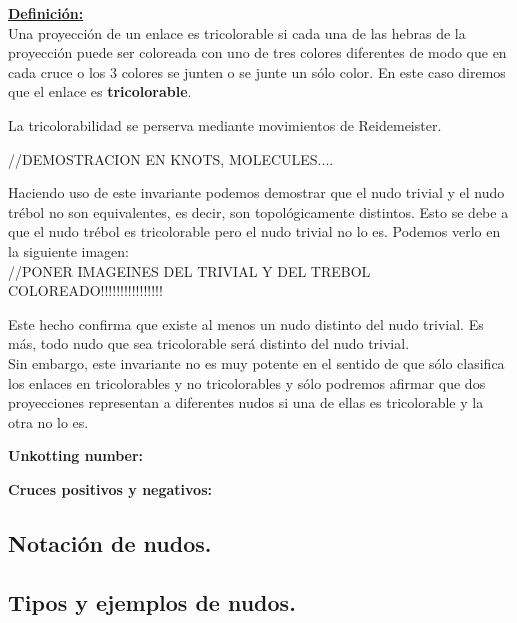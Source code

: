 \documentclass[14pt]{extarticle}
\begin{document}
\underline{\textbf{Definición:}}\\
Una proyección de un enlace es tricolorable si cada una de las hebras de la proyección puede ser coloreada con uno de tres colores diferentes de modo que en cada cruce o los 3 colores se junten o se junte un sólo color. En este caso diremos que el enlace es \textbf{tricolorable}. 

\begin{teo}
	La tricolorabilidad se perserva mediante movimientos de Reidemeister.
\end{teo}
//DEMOSTRACION EN KNOTS, MOLECULES....

Haciendo uso de este invariante podemos demostrar que el nudo trivial y el nudo trébol no son equivalentes, es decir, son topológicamente distintos. Esto se debe a que el nudo trébol es tricolorable pero el nudo trivial no lo es. Podemos verlo en la siguiente imagen:\\
//PONER IMAGEINES DEL TRIVIAL Y DEL TREBOL COLOREADO!!!!!!!!!!!!!!!!


Este hecho confirma que existe al menos un nudo distinto del nudo trivial. Es más, todo nudo que sea tricolorable será distinto del nudo trivial.\\
Sin embargo, este invariante no es muy potente en el sentido de que sólo clasifica los enlaces en tricolorables y no tricolorables y sólo podremos afirmar que dos proyecciones representan a diferentes nudos si una de ellas es tricolorable y la otra no lo es.   



\begin{center}
	\textbf{Unkotting number:}
\end{center}

\begin{center}
	\textbf{Cruces positivos y negativos:}
\end{center}

\subsection{Notación de nudos.}
\subsection{Tipos y ejemplos de nudos.}




 
\end{document}
